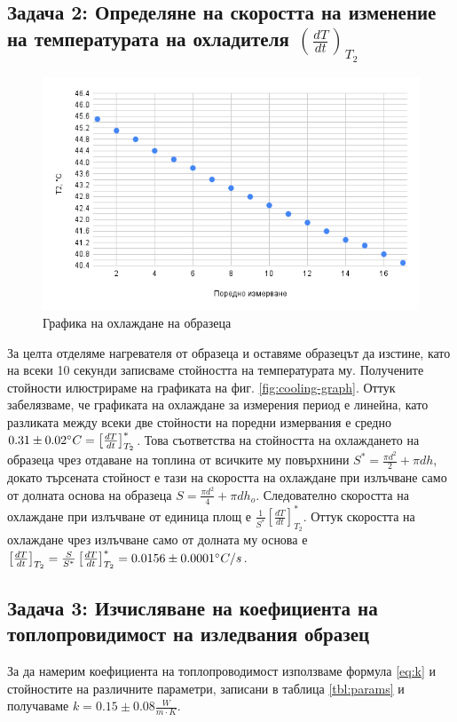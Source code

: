 \documentclass[12pt]{article}
\begin{document}
\subsection{Задача 2: Определяне на скоростта на изменение на температурата на охладителя $\left( \frac{dT}{dt}\right)_{T_2}$}
\begin{figure}
    \centering
    \includegraphics[width=1\textwidth]{images/chart.png}
    \caption{\label{fig:cooling-graph}Графика на охлаждане на образеца}
    \label{fig:setup}
\end{figure}

За целта отделяме нагревателя от образеца и оставяме образецът да изстине, като на всеки 10 секунди записваме стойността на температурата му. Получените стойности илюстрираме на графиката на фиг. \ref{fig:cooling-graph}. Оттук забелязваме, че графиката на охлаждане за измерения период е линейна, като разликата между всеки две стойности на поредни измервания е средно $0.31\pm0.02 \degree C = \left[\frac{dT}{dt}\right]^{*}_{T_2}$. Това съответства на стойността на охлаждането на образеца чрез отдаване на топлина от всичките му повърхнини $S^* = \frac{\pi d^2}{2} + \pi d h$, докато търсената стойност е тази на скоростта на охлаждане при излъчване само от долната основа на образеца $S = \frac{\pi d^2}{4} + \pi d h_o$. Следователно скоростта на охлаждане при излъчване от единица площ е $\frac{1}{S^*}\left[\frac{dT}{dt}\right]^{*}_{T_2}$. Оттук скоростта на охлаждане чрез излъчване само от долната му основа е $\left[\frac{dT}{dt}\right]_{T_2} = \frac{S}{S^*}\left[\frac{dT}{dt}\right]^{*}_{T_2} = 0.0156\pm 0.0001\degree C/s$.

\subsection{Задача 3: Изчисляване на коефициента на топлопровидимост на изледвания образец}
За да намерим коефициента на топлопроводимост използваме формула \ref{eq:k} и стойностите на различните параметри, записани в таблица \ref{tbl:params} и получаваме $k = 0.15 \pm 0.08\frac{W}{m\cdot K}$.
\end{document}
